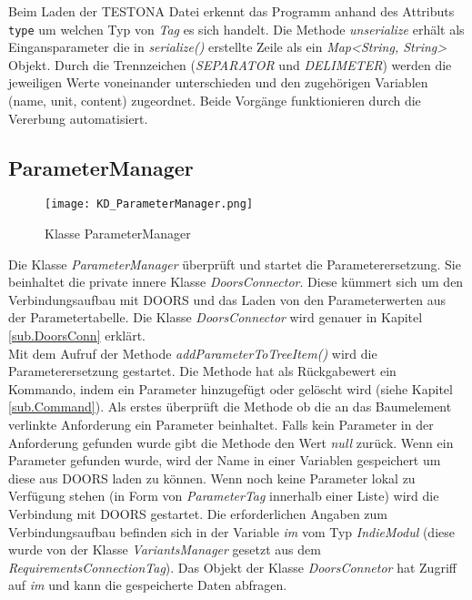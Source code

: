 Beim Laden der TESTONA Datei erkennt das Programm anhand des Attributs \texttt{type} um welchen Typ von \textit{Tag} es sich handelt. Die Methode \textit{unserialize} erhält als Eingansparameter die in \textit{serialize()} erstellte Zeile als ein \textit{Map<String, String>} Objekt. Durch die Trennzeichen (\textit{SEPARATOR} und \textit{DELIMETER}) werden die jeweiligen Werte voneinander unterschieden und den zugehörigen Variablen (name, unit, content) zugeordnet. Beide Vorgänge funktionieren durch die Vererbung automatisiert.

\subsection{ParameterManager}\label{sub:ParameterManager}

\begin{figure}[h]
  \begin{center}
    \texttt{[image: KD\_ParameterManager.png]}
  		  \caption{Klasse ParameterManager}
     \label{kd.ParameterMananger}
  \end{center}
\end{figure}

Die Klasse \textit{ParameterManager} überprüft und startet die Parameterersetzung. Sie beinhaltet die private innere Klasse \textit{DoorsConnector}. Diese kümmert sich um den Verbindungsaufbau mit DOORS und das Laden von den Parameterwerten aus der Parametertabelle. Die Klasse \textit{DoorsConnector} wird genauer in Kapitel \ref{sub.DoorsConn} erklärt.\\


Mit dem Aufruf der Methode \textit{addParameterToTreeItem()} wird die Parameterersetzung gestartet. Die Methode hat als Rückgabewert ein Kommando, indem ein Parameter hinzugefügt oder gelöscht wird (siehe Kapitel \ref{sub.Command}). Als erstes überprüft die Methode ob die an das Baumelement verlinkte Anforderung ein Parameter beinhaltet. Falls kein Parameter in der Anforderung gefunden wurde gibt die Methode den Wert \textit{null} zurück. Wenn ein Parameter gefunden wurde, wird der Name in einer Variablen gespeichert um diese aus DOORS laden zu können. Wenn noch keine Parameter lokal zu Verfügung stehen (in Form von \textit{ParameterTag} innerhalb einer Liste) wird die Verbindung mit DOORS gestartet. Die erforderlichen Angaben zum Verbindungsaufbau befinden sich in der Variable \textit{im} vom Typ \textit{IndieModul} (diese wurde von der Klasse \textit{VariantsManager} gesetzt aus dem \textit{RequirementsConnectionTag}). Das Objekt der Klasse \textit{DoorsConnetor} hat Zugriff auf \textit{im} und kann die gespeicherte Daten abfragen.\\


